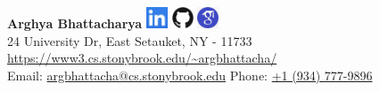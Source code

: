 \documentclass[letterpaper,10pt]{article}
\begin{document}
\begin{center}
\hspace{60pt}
\textbf{{\Huge Arghya Bhattacharya}} \hspace{5pt} {\href{https://www.linkedin.com/in/reach-arghya-bhattacharya/}{\includegraphics[width=0.25in,height=0.25in]{Figures/linkedin.png}}} \hspace{5pt}
{\href{https://github.com/ArghyaB118}{\includegraphics[width=0.25in,height=0.25in]{Figures/github.png}}} \hspace{5pt}
{\href{https://scholar.google.com/citations?user=tvw7c5wAAAAJ&hl=en}{\includegraphics[width=0.25in,height=0.25in]{Figures/googlescholar.png}}} \\
\vspace{5pt}
{24 University Dr, East Setauket, NY - 11733} \\
{\url{https://www3.cs.stonybrook.edu/~argbhattacha/}} \\
{Email: \href{mailto:argbhattacha@cs.stonybrook.edu}{argbhattacha@cs.stonybrook.edu}}
\hspace{10pt}
{Phone: \href{tel:(+1)934-777-9896}{+1 (934) 777-9896}}
\end{center}
\end{document}
